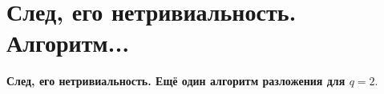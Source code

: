 \section{
 След, его нетривиальность. Алгоритм... %
}

\textbf{След, его нетривиальность. Ещё один алгоритм разложения для $q = 2$}.
